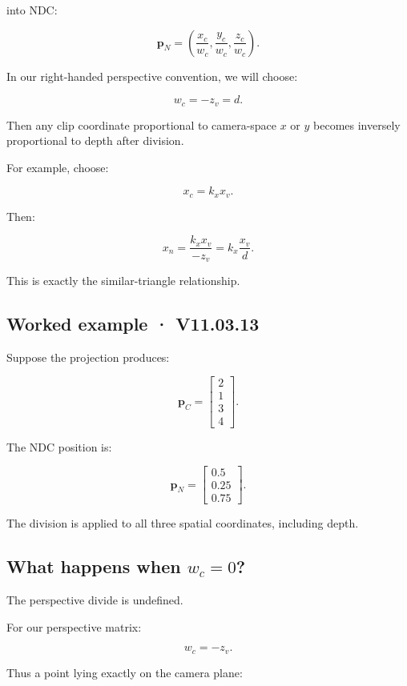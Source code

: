 into NDC:

\[
 \boxed{ \mathbf p_N= \left( \frac{x_c}{w_c}, \frac{y_c}{w_c}, \frac{z_c}{w_c} \right) }.
\]

In our right-handed perspective convention, we will choose:

\[
 \boxed{ w_c=-z_v=d }.
\]

Then any clip coordinate proportional to camera-space \(x\) or \(y\) becomes inversely proportional to depth after division.

For example, choose:

\[
 x_c=k_xx_v.
\]

Then:

\[
 x_n= \frac{k_xx_v}{-z_v} = k_x\frac{x_v}{d}.
\]

This is exactly the similar-triangle relationship.

\subsection{Worked example · V11.03.13}\label{02-foundations-ii-ch033-worked-example-v11.03.13}

Suppose the projection produces:

\[
 \mathbf p_C= \begin{bmatrix} 2\\1\\3\\4 \end{bmatrix}.
\]

The NDC position is:

\[
 \boxed{ \mathbf p_N= \begin{bmatrix} 0.5\\0.25\\0.75 \end{bmatrix} }.
\]

The division is applied to all three spatial coordinates, including depth.

\subsection{\texorpdfstring{What happens when \(w_c=0\)?}{What happens when w\_c=0?}}\label{02-foundations-ii-ch033-what-happens-when-w_c0}

The perspective divide is undefined.

For our perspective matrix:

\[
 w_c=-z_v.
\]

Thus a point lying exactly on the camera plane:


